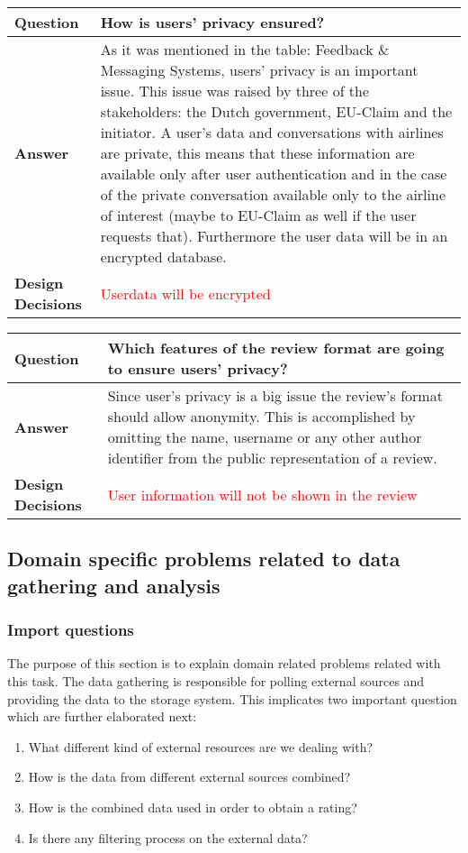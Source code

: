 \begin{longtable}{| l |  p{12cm} |}
\hline
\textbf{Question} & \textbf{How is users' privacy ensured?}  \\ \hline
\textbf{Answer} &
	As it was mentioned in the table: Feedback \& Messaging Systems, users' privacy is an important issue. This issue was raised by three of the stakeholders: the
Dutch government, EU-Claim and the initiator. A user's data and conversations with airlines are private, this means that these information are available only after user authentication 
and in the case of the private conversation available only to the airline of interest (maybe to EU-Claim as well if the user requests that). Furthermore the user data will be in an encrypted database.
 \\ \hline
\textbf{Design Decisions} & \textcolor{red}{Userdata will be encrypted} \\ \hline
\end{longtable}

\begin{longtable}{| l |  p{12cm} |}
\hline
\textbf{Question} & \textbf{Which features of the review format are going to ensure users' privacy?}  \\ \hline
\textbf{Answer} &
	Since user's privacy is a big issue the review's format should allow anonymity. This is accomplished by omitting the name, username or any other author 
identifier from the public representation of a review.
 \\ \hline
\textbf{Design Decisions} & \textcolor{red}{User information will not be shown in the review} \\ \hline
\end{longtable}


\subsection{Domain specific problems related to data gathering and analysis}
\subsubsection{Import questions}
The purpose of this section is to explain domain related problems related with this task. The data gathering is responsible for polling external sources and providing the data to the storage system. This implicates two important question which are further elaborated next:
\begin{enumerate}
\item   What different kind of external resources are we dealing with?
\item	How is the data from different external sources combined?
\item	How is the combined data used in order to obtain a rating?
\item	Is there any filtering process on the external data?
\end{enumerate}

